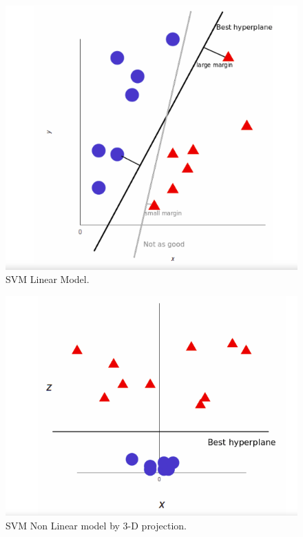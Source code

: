 \documentclass[a4paper,10pt]{article}
\begin{document}
\begin{enumerate}
\begin{figure}[h]
    	\includegraphics[scale=0.30,center]{svmClassification.png}
    	\caption{SVM Linear Model.}
    	\label{fig:1}
    \end{figure}
    \begin{figure}[h]
    	\includegraphics[scale=0.30,center]{svmNonLinearData.png}
    	\caption{SVM Non Linear model by 3-D projection.}
    	\label{fig:2}
    \end{figure}
    
\end{enumerate}
\end{document}
